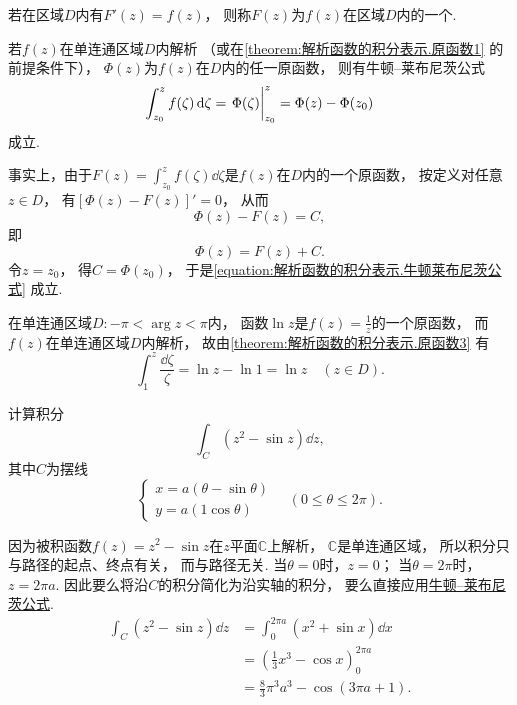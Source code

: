 \begin{definition}
若在区域\(D\)内有\(F'(z)=f(z)\)，
则称\(F(z)\)为\(f(z)\)在区域\(D\)内的一个.
\end{definition}

\begin{corollary}\label{theorem:解析函数的积分表示.原函数3}
若\(f(z)\)在单连通区域\(D\)内解析
（或在\cref{theorem:解析函数的积分表示.原函数1} 的前提条件下），
\(\Phi(z)\)为\(f(z)\)在\(D\)内的任一原函数，
则有牛顿--莱布尼茨公式
\begin{equation}\label{equation:解析函数的积分表示.牛顿莱布尼茨公式}
	\int_{z_0}^z f(\zeta) \dd{\zeta}
	= \eval{\Phi(\zeta)}_{z_0}^z
	= \Phi(z)-\Phi(z_0)
\end{equation}成立.
\end{corollary}
事实上，由于\(F(z) = \int_{z_0}^z f(\zeta) \dd{\zeta}\)是\(f(z)\)在\(D\)内的一个原函数，
按定义对任意\(z \in D\)，
有\([\Phi(z) - F(z)]'=0\)，
从而\[
	\Phi(z) - F(z) = C,
\]
即\[
	\Phi(z) = F(z) + C.
\]
令\(z=z_0\)，
得\(C = \Phi(z_0)\)，
于是\cref{equation:解析函数的积分表示.牛顿莱布尼茨公式} 成立.

\begin{example}
在单连通区域\(D: -\pi<\arg z<\pi\)内，
函数\(\ln z\)是\(f(z) = \frac{1}{z}\)的一个原函数，
而\(f(z)\)在单连通区域\(D\)内解析，
故由\cref{theorem:解析函数的积分表示.原函数3} 有\[
	\int_1^z \frac{\dd{\zeta}}{\zeta}
	= \ln z - \ln 1
	= \ln z \quad(z \in D).
\]
\end{example}

\begin{example}
计算积分\[
	\int_C (z^2 - \sin z) \dd{z},
\]
其中\(C\)为摆线\[
	\left\{ \begin{array}{l}
	x = a(\theta-\sin\theta) \\
	y = a(1\cos\theta)
	\end{array} \right.
	\quad(0\leq\theta\leq2\pi).
\]
\begin{solution}
因为被积函数\(f(z) = z^2 - \sin z\)在\(z\)平面\(\mathbb{C}\)上解析，
\(\mathbb{C}\)是单连通区域，
所以积分只与路径的起点、终点有关，
而与路径无关.
当\(\theta=0\)时，\(z=0\)；
当\(\theta=2\pi\)时，\(z=2\pi a\).
因此要么将沿\(C\)的积分简化为沿实轴的积分，
要么直接应用\hyperref[equation:解析函数的积分表示.牛顿莱布尼茨公式]{牛顿--莱布尼茨公式}.
\begin{align*}
	\int_C (z^2 - \sin z) \dd{z}
	&= \int_0^{2\pi a} (x^2 + \sin x) \dd{x} \\
	&= \left(\frac{1}{3} x^3 - \cos x\right)_0^{2\pi a} \\
	&= \frac{8}{3} \pi^3 a^3 - \cos(3\pi a+1).
\end{align*}
\end{solution}
\end{example}


